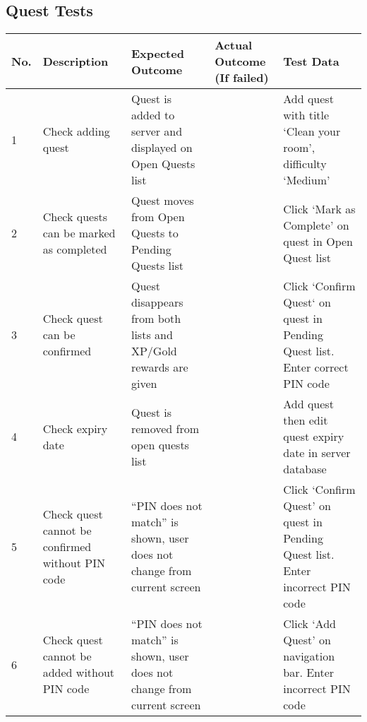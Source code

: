 \begin{landscape}
\section{Quest Tests}
\begin{tabularx}{\linewidth}{p{1cm} X X X X}
\textbf{No.} & \textbf{Description}                    & \textbf{Expected Outcome}                                  	& \textbf{Actual Outcome (If failed)} & \textbf{Test Data}                                          \\ \hline
1            & Check adding quest                               & Quest is added to server and displayed on Open Quests list                         &                                                                  & Add quest with title `Clean your room', difficulty `Medium'                    \\ \hline
2            & Check quests can be marked as completed          & Quest moves from Open Quests to Pending Quests list                                &                                                                  & Click `Mark as Complete' on quest in Open Quest list                           \\ \hline
3            & Check quest can be confirmed                     & Quest disappears from both lists and XP/Gold rewards are given                    &                                                                  & Click `Confirm Quest` on quest in Pending Quest list. Enter correct PIN code   \\ \hline
4            & Check expiry date                                & Quest is removed from open quests list                                             &                                                                  & Add quest then edit quest expiry date in server database                             \\ \hline
5            & Check quest cannot be confirmed without PIN code & ``PIN does not match'' is shown, user does not change from current screen    &                                                                  & Click `Confirm Quest' on quest in Pending Quest list. Enter incorrect PIN code \\ \hline
6            & Check quest cannot be added without PIN code     & ``PIN does not match'' is shown, user does not change from current screen    &                                                                  & Click `Add Quest' on navigation bar. Enter incorrect PIN code                  \\ \hline

\end{tabularx}
\end{landscape}
